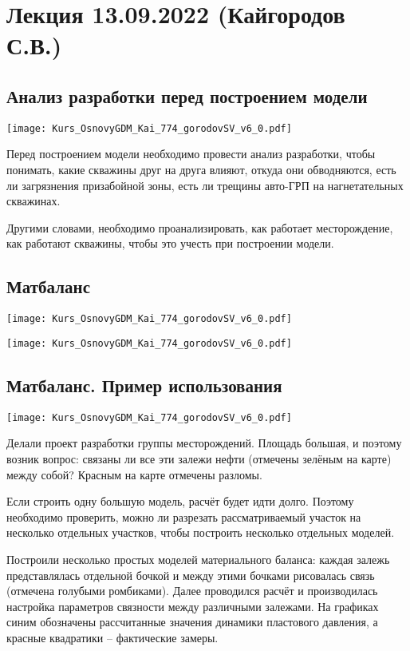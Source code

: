\documentclass[main.tex]{subfiles}
\begin{document}
\section{Лекция 13.09.2022 (Кайгородов С.В.)}

\subsection{Анализ разработки перед построением модели}

\texttt{[image: Kurs\_OsnovyGDM\_Kai\_774\_gorodovSV\_v6\_0.pdf]}

Перед построением модели необходимо провести анализ разработки, чтобы понимать, какие скважины друг на друга влияют, откуда они обводняются, есть ли загрязнения призабойной зоны, есть ли трещины авто-ГРП на нагнетательных скважинах.

Другими словами, необходимо проанализировать, как работает месторождение, как работают скважины, чтобы это учесть при построении модели.

\subsection{Матбаланс}

\texttt{[image: Kurs\_OsnovyGDM\_Kai\_774\_gorodovSV\_v6\_0.pdf]}


\texttt{[image: Kurs\_OsnovyGDM\_Kai\_774\_gorodovSV\_v6\_0.pdf]}

\subsection{Матбаланс. Пример использования}

\texttt{[image: Kurs\_OsnovyGDM\_Kai\_774\_gorodovSV\_v6\_0.pdf]}

Делали проект разработки группы месторождений.
Площадь большая, и поэтому возник вопрос: связаны ли все эти залежи нефти (отмечены зелёным на карте) между собой?
Красным на карте отмечены разломы.

Если строить одну большую модель, расчёт будет идти долго. Поэтому необходимо проверить, можно ли разрезать рассматриваемый участок на несколько отдельных участков, чтобы построить несколько отдельных моделей.

Построили несколько простых моделей материального баланса: каждая залежь представлялась отдельной бочкой и между этими бочками рисовалась связь (отмечена голубыми ромбиками). Далее проводился расчёт и производилась настройка параметров связности
между различными залежами.
На графиках синим обозначены рассчитанные значения динамики пластового давления, а красные квадратики -- фактические замеры.
\end{document}
